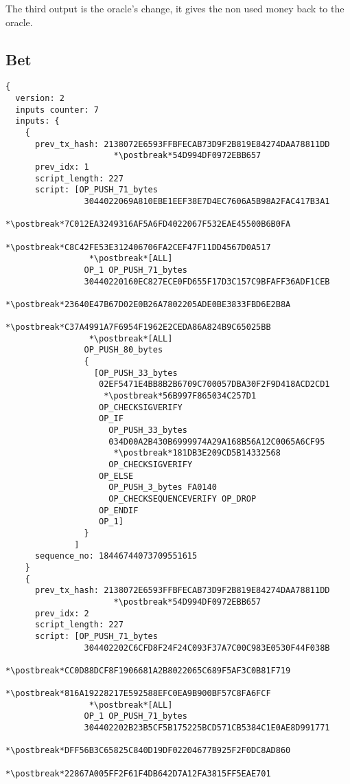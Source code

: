 The third output is the oracle's change, it gives the non used money back to
  the oracle.

\subsection{Bet}

\begin{lstlisting}
{
  version: 2
  inputs counter: 7
  inputs: {
    {
      prev_tx_hash: 2138072E6593FFBFECAB73D9F2B819E84274DAA78811DD
                      *\postbreak*54D994DF0972EBB657
      prev_idx: 1
      script_length: 227
      script: [OP_PUSH_71_bytes
                3044022069A810EBE1EEF38E7D4EC7606A5B98A2FAC417B3A1
                 *\postbreak*7C012EA3249316AF5A6FD4022067F532EAE45500B6B0FA
                 *\postbreak*C8C42FE53E312406706FA2CEF47F11DD4567D0A517
                 *\postbreak*[ALL]
                OP_1 OP_PUSH_71_bytes
                30440220160EC827ECE0FD655F17D3C157C9BFAFF36ADF1CEB
                 *\postbreak*23640E47B67D02E0B26A7802205ADE0BE3833FBD6E2B8A
                 *\postbreak*C37A4991A7F6954F1962E2CEDA86A824B9C65025BB
                 *\postbreak*[ALL]
                OP_PUSH_80_bytes
                {
                  [OP_PUSH_33_bytes
                   02EF5471E4BB8B2B6709C700057DBA30F2F9D418ACD2CD1
                    *\postbreak*56B997F865034C257D1
                   OP_CHECKSIGVERIFY
                   OP_IF
                     OP_PUSH_33_bytes
                     034D00A2B430B6999974A29A168B56A12C0065A6CF95
                      *\postbreak*181DB3E209CD5B14332568
                     OP_CHECKSIGVERIFY
                   OP_ELSE
                     OP_PUSH_3_bytes FA0140
                     OP_CHECKSEQUENCEVERIFY OP_DROP
                   OP_ENDIF
                   OP_1]
                }
              ]
      sequence_no: 18446744073709551615
    }
    {
      prev_tx_hash: 2138072E6593FFBFECAB73D9F2B819E84274DAA78811DD
                      *\postbreak*54D994DF0972EBB657
      prev_idx: 2
      script_length: 227
      script: [OP_PUSH_71_bytes
                304402202C6CFD8F24F24C093F37A7C00C983E0530F44F038B
                 *\postbreak*CC0D88DCF8F1906681A2B8022065C689F5AF3C0B81F719
                 *\postbreak*816A19228217E592588EFC0EA9B900BF57C8FA6FCF
                 *\postbreak*[ALL]
                OP_1 OP_PUSH_71_bytes
                304402202B23B5CF5B175225BCD571CB5384C1E0AE8D991771
                 *\postbreak*DFF56B3C65825C840D19DF02204677B925F2F0DC8AD860
                 *\postbreak*22867A005FF2F61F4DB642D7A12FA3815FF5EAE701

\end{lstlisting}
